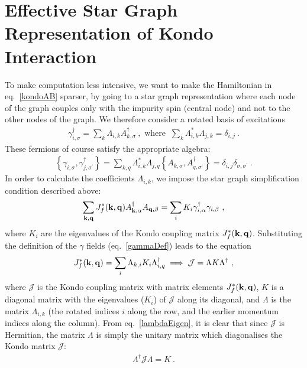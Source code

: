\documentclass[%
reprint,
superscriptaddress,
groupedaddress,
superscriptaddress,
onecolumn,
10pt
]{revtex4-2}
\begin{document}
\section{Effective Star Graph Representation of Kondo Interaction}
To make computation less intensive, we want to make the Hamiltonian in eq.~\ref{kondoAB} sparser, by going to a star graph representation where each node of the graph couples only with the impurity spin (central node) and not to the other nodes of the graph. We therefore consider a rotated basis of excitations
\begin{equation}\begin{aligned}\label{gammaDef}
	\gamma_{i,\sigma}^\dagger = \sum_{k}\Lambda_{i, k} A^\dagger_{k,\sigma}~,\text{ where }~\sum_{k}\Lambda^*_{i, k}\Lambda_{j, k} = \delta_{i,j}~.
\end{aligned}\end{equation}
These fermions of course satisfy the appropriate algebra:
\begin{equation}\begin{aligned}
	\left\{\gamma_{i,\sigma}, \gamma^\dagger_{j,\sigma^\prime}\right\} = \sum_{k, q}\Lambda^*_{i, k}\Lambda_{j, q} \left\{A_{k,\sigma}, A_{q,\sigma^\prime}^\dagger\right\} = \delta_{i, j}\delta_{\sigma,\sigma^\prime}~.
\end{aligned}\end{equation}
In order to calculate the coefficients \(\Lambda_{i, k}\), we impose the star graph simplification condition described above:
\begin{equation}\begin{aligned}
	\sum_{{\bf k}, {\bf q}} J_f^*({\bf k},{\bf q}) A^\dagger_{{\bf k},\alpha}A_{{\bf q},\beta} = \sum_i K_i \gamma^\dagger_{i,\alpha}\gamma_{i,\beta}~,
\end{aligned}\end{equation}
where \(K_i\) are the eigenvalues of the Kondo coupling matrix \(J_f^*({\bf k},{\bf q})\). Substituting the definition of the \(\gamma\) fields (eq.~\ref{gammaDef}) leads to the equation
\begin{equation}\begin{aligned}\label{lambdaEigen}
	J_f^*({\bf k},{\bf q}) = \sum_i \Lambda_{k, i} K_i \Lambda^\dagger_{i,q} \implies \mathcal{J} = \Lambda K \Lambda^\dagger~,
\end{aligned}\end{equation}
where \(\mathcal{J}\) is the Kondo coupling matrix with matrix elements \(J_f^*({\bf k},{\bf q})\), \(K\) is a diagonal matrix with the eigenvalues (\(K_i\)) of \(\mathcal{J}\) along its diagonal, and \(\Lambda\) is the matrix \(\Lambda_{i, k}\) (the rotated indices \(i\) along the row, and the earlier momentum indices along the column). From eq.~\ref{lambdaEigen}, it is clear that since \(\mathcal{J}\) is Hermitian, the matrix \(\Lambda\) is simply the unitary matrix which diagonalises the Kondo matrix \(\mathcal{J}\):
\begin{equation}\begin{aligned}
\Lambda^\dagger \mathcal{J} \Lambda = K~.
\end{aligned}\end{equation}
\end{document}
